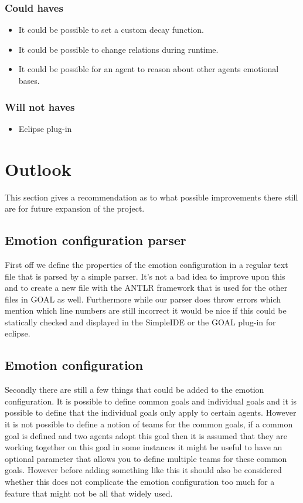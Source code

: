 \documentclass[]{article}
\begin{document}
\subsubsection*{Could haves}

\begin{itemize}
	\item It could be possible to set a custom decay function.
	\item It could be possible to change relations during runtime.
	
	\item It could be possible for an agent to reason about other agents emotional bases.
\end{itemize}

\subsubsection*{Will not haves}
\begin{itemize}
	\item Eclipse plug-in
\end{itemize}

\clearpage

\section{Outlook}
This section gives a recommendation as to what possible improvements there still are for future expansion of the project.

\subsection{Emotion configuration parser}
First off we define the properties of the emotion configuration in a regular text file that is parsed by a simple parser. It's not a bad idea to improve upon this and to create a new file with the ANTLR framework that is used for the other files in GOAL as well. Furthermore while our parser does throw errors which mention which line numbers are still incorrect it would be nice if this could be statically checked and displayed in the SimpleIDE or the GOAL plug-in for eclipse.

\subsection{Emotion configuration}
Secondly there are still a few things that could be added to the emotion configuration. It is possible to define common goals and individual goals and it is possible to define that the individual goals only apply to certain agents. However it is not possible to define a notion of teams for the common goals, if a common goal is defined and two agents adopt this goal then it is assumed that they are working together on this goal in some instances it might be useful to have an optional parameter that allows you to define multiple teams for these common goals. However before adding something like this it should also be considered whether this does not complicate the emotion configuration too much for a feature that might not be all that widely used.
\end{document}
